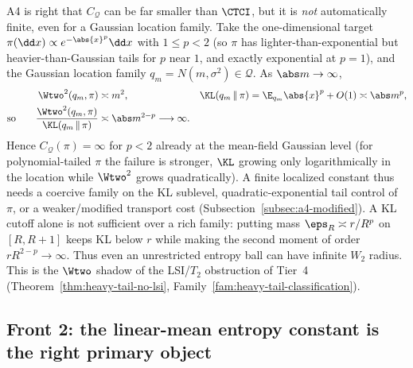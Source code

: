 \documentclass[../../main.tex]{subfiles}
\begin{document}
\begin{warning}
\label{warn:a4-heavytail}
A4 is right that $C_{\mathcal Q}$ can be far smaller than $\CTCI$, but it is \emph{not}
automatically finite, even for a Gaussian location family. Take the one-dimensional target
$\pi(\dd x)\propto e^{-\abs{x}^p}\dd x$ with $1\le p<2$ (so $\pi$ has lighter-than-exponential
but heavier-than-Gaussian tails for $p$ near $1$, and exactly exponential at $p=1$), and the
Gaussian location family $q_m=N(m,\sigma^2)\in\mathcal Q$. As $\abs m\to\infty$,
\[
  \begin{aligned}
    \Wtwo^2(q_m,\pi)&\asymp m^2,
    &\KL(q_m\,\|\,\pi)&=\E_{q_m}\abs{x}^p+O(1)\asymp\abs m^p,\\
    \text{so}\qquad
    \frac{\Wtwo^2(q_m,\pi)}{\KL(q_m\,\|\,\pi)}&\asymp\abs m^{2-p}\longrightarrow\infty.
  \end{aligned}
\]
Hence $C_{\mathcal Q}(\pi)=\infty$ for $p<2$ already at the mean-field Gaussian level (for
polynomial-tailed $\pi$ the failure is stronger, $\KL$ growing only logarithmically in the
location while $\Wtwo^2$ grows quadratically). A finite localized constant thus needs a coercive
family on the KL sublevel, quadratic-exponential tail control of $\pi$, or a weaker/modified
transport cost (Subsection~\ref{subsec:a4-modified}). A KL cutoff alone is not sufficient over a
rich family: putting mass $\eps_R\asymp r/R^p$ on $[R,R+1]$ keeps KL below $r$ while making the
second moment of order $rR^{2-p}\to\infty$. Thus even an unrestricted entropy ball can have
infinite $W_2$ radius.
This is the $\Wtwo$ shadow of the LSI/$T_2$ obstruction of Tier~4
(Theorem~\ref{thm:heavy-tail-no-lsi}, Family~\ref{fam:heavy-tail-classification}).
\end{warning}

\subsection{Front 2: the linear-mean entropy constant is the right primary object}
\label{subsec:a4-mean}
\end{document}
